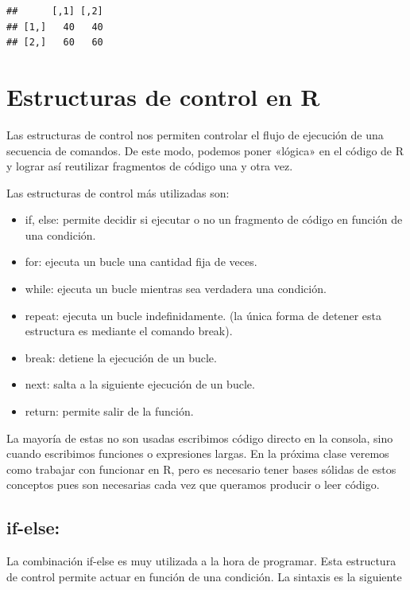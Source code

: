 \documentclass[
  12pt,
]{book}
\providecommand{\tightlist}{%
  \setlength{\itemsep}{0pt}\setlength{\parskip}{0pt}}
\begin{document}
\begin{verbatim}
##      [,1] [,2]
## [1,]   40   40
## [2,]   60   60
\end{verbatim}

\hypertarget{estructuras-de-control-en-r}{%
\chapter{\texorpdfstring{\textbf{Estructuras de control en R}}{Estructuras de control en R}}\label{estructuras-de-control-en-r}}

Las estructuras de control nos permiten controlar el flujo de ejecución de una secuencia de comandos.
De este modo, podemos poner «lógica» en el código de R y lograr así reutilizar fragmentos de código una y otra vez.

Las estructuras de control más utilizadas son:

\begin{itemize}
\tightlist
\item
  if, else: permite decidir si ejecutar o no un fragmento de código en función de una condición.
\item
  for: ejecuta un bucle una cantidad fija de veces.
\item
  while: ejecuta un bucle mientras sea verdadera una condición.
\item
  repeat: ejecuta un bucle indefinidamente. (la única forma de detener esta estructura es mediante el comando break).
\item
  break: detiene la ejecución de un bucle.
\item
  next: salta a la siguiente ejecución de un bucle.
\item
  return: permite salir de la función.
\end{itemize}

La mayoría de estas no son usadas escribimos código directo en la consola, sino cuando escribimos funciones o expresiones largas. En la próxima clase veremos como trabajar con funcionar en R, pero es necesario tener bases sólidas de estos conceptos pues son necesarias cada vez que queramos producir o leer código.

\hypertarget{if-else}{%
\section{\texorpdfstring{\textbf{if-else}:}{if-else:}}\label{if-else}}

La combinación if-else es muy utilizada a la hora de programar. Esta estructura de control permite actuar en función de una condición.
La sintaxis es la siguiente
\end{document}
